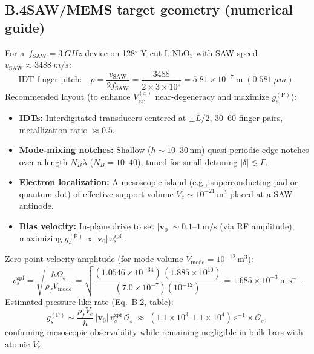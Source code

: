 \documentclass[aps,prb,preprint,amsmath,amssymb]{revtex4-2} %
\newcommand{\rhoF}{\rho_{f}}
\begin{document}
    \subsection*{B.4\quad SAW/MEMS target geometry (numerical guide)}
        For a \(\,f_\textrm{SAW}=\SI{3}{GHz}\) device on 128$^\circ$ Y-cut LiNbO\(_3\) with SAW speed \(v_\textrm{SAW}\approx \SI{3488}{m/s}\):
        \[
            \text{IDT finger pitch:}\quad p=\frac{v_\textrm{SAW}}{2 f_\textrm{SAW}}
            =\frac{3488}{2\times 3\times 10^{9}}
            =\boxed{5.81\times 10^{-7}\ \mathrm{m}\;(\SI{0.581}{\mu m})}.
        \]
        Recommended layout (to enhance \(V^{(x)}_{ss'}\) near-degeneracy and maximize \(g_s^{(\mathrm P)}\)):
        \begin{itemize}\itemsep2pt
        \item \textbf{IDTs:} Interdigitated transducers centered at \(\pm L/2\), 30–60 finger pairs, metallization ratio \(\approx 0.5\).
        \item \textbf{Mode-mixing notches:} Shallow (\(h\sim\!10\text{–}30\,\mathrm{nm}\)) quasi-periodic edge notches over a length \(N_B\lambda\) (\(N_B\!=\!10\text{–}40\)), tuned for small detuning \(|\delta|\lesssim \Gamma\).
        \item \textbf{Electron localization:} A mesoscopic island (e.g., superconducting pad or quantum dot) of effective support volume \(V_e\sim 10^{-21}\,\mathrm{m^3}\) placed at a SAW antinode.
        \item \textbf{Bias velocity:} In-plane drive to set \(|\mathbf v_0|\sim 0.1\text{–}1\,\mathrm{m/s}\) (via RF amplitude), maximizing \(g_s^{(\mathrm P)}\propto |\mathbf v_0|\,v_s^\textrm{zpf}\).
        \end{itemize}
        Zero-point velocity amplitude (for mode volume \(V_\textrm{mode}=10^{-12}\,\mathrm{m^3}\)):
        \[
            v_s^\textrm{zpf}=\sqrt{\frac{\hbar \Omega_s}{\rhoF V_\textrm{mode}}}
            =\sqrt{\frac{(1.0546\times10^{-34})\,(1.885\times10^{10})}{(7.0\times10^{-7})(10^{-12})}}
            =\boxed{1.685\times 10^{-3}\ \mathrm{m\,s^{-1}}}.
        \]
        Estimated pressure-like rate (Eq.~B.2, table):
        \[
            g_s^{(\mathrm P)}\sim \frac{\rhoF V_e}{\hbar}\,|\mathbf v_0|\,v_s^\textrm{zpf}\,\mathcal O_s
            \;\approx\; (1.1\times10^{3}\text{–}1.1\times10^{4})\ \mathrm{s^{-1}}\times \mathcal O_s,
        \]
        confirming mesoscopic observability while remaining negligible in bulk bars with atomic \(V_e\).
\end{document}
